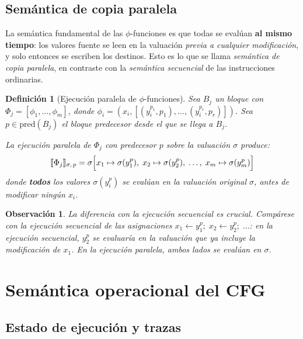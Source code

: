 \documentclass[12pt, a4paper]{article}
\newtheorem{definition}{Definición}[section]
\newtheorem{remark}{Observación}[section]
\begin{document}
\subsection{Semántica de copia paralela}

La semántica fundamental de las $\phi$-funciones es que todas se evalúan \textbf{al mismo tiempo}:
los valores fuente se leen en la valuación \emph{previa a cualquier modificación}, y solo
entonces se escriben los destinos. Esto es lo que se llama \emph{semántica de copia paralela},
en contraste con la \emph{semántica secuencial} de las instrucciones ordinarias.

\begin{definition}[Ejecución paralela de $\phi$-funciones]
\label{def:ejec-phi}
Sea $B_j$ un bloque con $\Phi_j = [\phi_1, \ldots, \phi_m]$, donde
$\phi_i = (x_i, [(y_i^{p_1}, p_1), \ldots, (y_i^{p_r}, p_r)])$.
Sea $p \in \mathrm{pred}(B_j)$ el bloque predecesor desde el que se llega a $B_j$.

La \emph{ejecución paralela} de $\Phi_j$ con predecesor $p$ sobre la valuación $\sigma$ produce:
\[
  \llbracket \Phi_j \rrbracket_{\sigma,\, p}
  = \sigma\Bigl[x_1 \mapsto \sigma(y_1^p),\; x_2 \mapsto \sigma(y_2^p),\; \ldots,\; x_m \mapsto \sigma(y_m^p)\Bigr]
\]
donde \textbf{todos} los valores $\sigma(y_i^p)$ se evalúan en la valuación \emph{original}
$\sigma$, antes de modificar ningún $x_i$.
\end{definition}

\begin{remark}
La diferencia con la ejecución secuencial es crucial. Compárese con la ejecución secuencial de
las asignaciones $x_1 \leftarrow y_1^p;\; x_2 \leftarrow y_2^p;\; \ldots$: en la ejecución
secuencial, $y_2^p$ se evaluaría en la valuación que ya incluye la modificación de $x_1$. En la
ejecución paralela, ambos lados se evalúan en $\sigma$.
\end{remark}

\section{Semántica operacional del CFG}

\subsection{Estado de ejecución y trazas}
\end{document}
